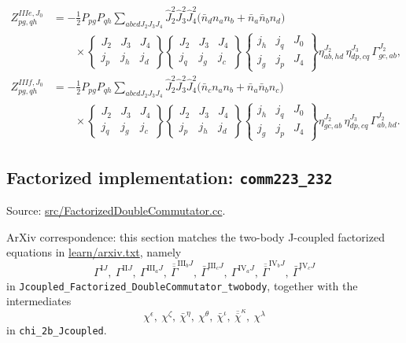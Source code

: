 \documentclass[
]{article}
\begin{document}
\begin{equation}
\begin{aligned}
Z^{IIIe,J_0}_{pg,qh}
&=-\frac{1}{2}P_{pg}P_{qh}\sum_{abcdJ_2J_3J_4}
\hat J_2^2\hat J_3^2\hat J_4^2
\Big(\bar n_d n_a n_b+\bar n_a\bar n_b n_d\Big) \\
&\qquad\times
\begin{Bmatrix} J_2&J_3&J_4\\ j_p&j_h&j_d\end{Bmatrix}
\begin{Bmatrix} J_2&J_3&J_4\\ j_q&j_g&j_c\end{Bmatrix}
\begin{Bmatrix} j_h&j_q&J_0\\ j_g&j_p&J_4\end{Bmatrix}
\eta^{J_2}_{ab,hd}\,
\eta^{J_3}_{dp,cq}\,
\Gamma^{J_2}_{gc,ab},\\
Z^{IIIf,J_0}_{pg,qh}
&=-\frac{1}{2}P_{pg}P_{qh}\sum_{abcdJ_2J_3J_4}
\hat J_2^2\hat J_3^2\hat J_4^2
\Big(\bar n_c n_a n_b+\bar n_a\bar n_b n_c\Big) \\
&\qquad\times
\begin{Bmatrix} J_2&J_3&J_4\\ j_q&j_g&j_c\end{Bmatrix}
\begin{Bmatrix} J_2&J_3&J_4\\ j_p&j_h&j_d\end{Bmatrix}
\begin{Bmatrix} j_h&j_q&J_0\\ j_g&j_p&J_4\end{Bmatrix}
\eta^{J_2}_{gc,ab}\,
\eta^{J_3}_{dp,cq}\,
\Gamma^{J_2}_{ab,hd}.
\end{aligned}
\end{equation}

\subsection{\texorpdfstring{Factorized implementation:
\texttt{comm223\_232}}{Factorized implementation: comm223\_232}}\label{factorized-implementation-comm223_232}

Source:
\href{../src/FactorizedDoubleCommutator.cc\#L805-L3049}{src/FactorizedDoubleCommutator.cc}.

ArXiv correspondence: this section matches the two-body J-coupled
factorized equations in \href{./arxiv.txt}{learn/arxiv.txt}, namely \begin{equation}
\Gamma^{\mathrm{I}J},\ \Gamma^{\mathrm{II}J},\ \Gamma^{\mathrm{III}_aJ},\ \overline{\overline\Gamma}^{\mathrm{III}_bJ},\ \bar\Gamma^{\mathrm{III}_cJ},\ \Gamma^{\mathrm{IV}_aJ},\ \overline{\overline\Gamma}^{\mathrm{IV}_bJ},\ \bar\Gamma^{\mathrm{IV}_cJ}
\end{equation} in \texttt{Jcoupled\_Factorized\_DoubleCommutator\_twobody}, together
with the intermediates \begin{equation}
\chi^{\epsilon},\ \chi^{\zeta},\ \bar\chi^{\eta},\ \chi^{\theta},\ \bar\chi^{\iota},\ \overline{\overline\chi}^{\kappa},\ \chi^{\lambda}
\end{equation} in \texttt{chi\_2b\_Jcoupled}.
\end{document}
